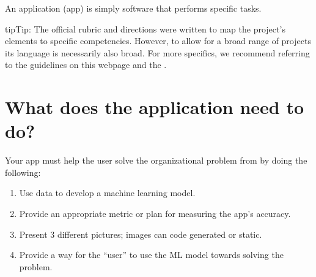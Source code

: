\documentclass[letterpaper,10pt,english]{jupyterBook}
\begin{document}
\begin{sphinxShadowBox}

\sphinxAtStartPar
An application (app) is simply software that performs specific tasks.
\end{sphinxShadowBox}

\begin{sphinxadmonition}{tip}{Tip:}
\sphinxAtStartPar
The official rubric and directions were written to map the project’s elements to specific competencies. However, to allow for a broad range of projects its language is necessarily also broad. For more specifics, we recommend referring to the guidelines on this webpage and the .
\end{sphinxadmonition}


\section{What does the application need to do?}
\label{\detokenize{task2_c/task2_part_c:what-does-the-application-need-to-do}}\label{\detokenize{task2_c/task2_part_c:task2-part-c-what-does-the-application-need-to-do}}

\label{\detokenize{task2_c/task2_part_c:id1}}
\sphinxAtStartPar
Your app must help the user solve the organizational problem from {\hyperref[\detokenize{task1:task1}]{}} by doing the following:
\begin{enumerate}
%
\item {} 
\sphinxAtStartPar
{} Use data to develop a machine learning model.

\item {} 
\sphinxAtStartPar
{} Provide an appropriate metric or plan for measuring the app’s accuracy.

\item {} 
\sphinxAtStartPar
{} Present 3 different pictures; images can code generated or static.

\item {} 
\sphinxAtStartPar
{} Provide a way for the “user” to use the ML model towards solving the problem.

\end{enumerate}
\end{document}
